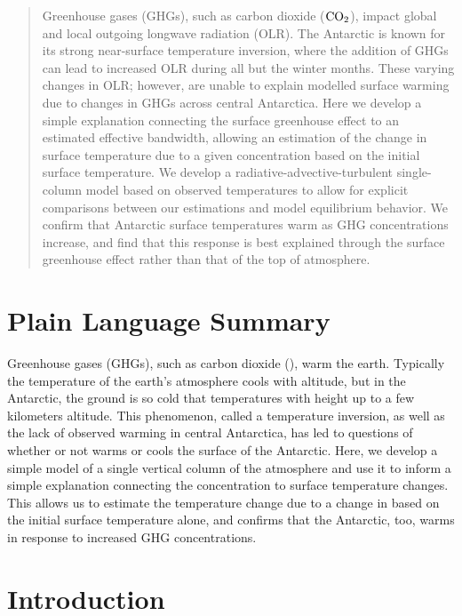 \documentclass[draft]{agujournal2019}
\begin{document}
\begin{abstract}
Greenhouse gases (GHGs), such as carbon dioxide ($\ce{CO_2}$), impact global and local outgoing longwave radiation (OLR). The Antarctic is known for its strong near-surface temperature inversion, where the addition of GHGs can lead to increased OLR during all but the winter months. These varying changes in OLR; however, are unable to explain modelled surface warming due to changes in GHGs across central Antarctica. Here we develop a simple explanation connecting the surface greenhouse effect to an estimated effective bandwidth, allowing an estimation of the change in surface temperature due to a given  concentration based on the initial surface temperature. We develop a radiative-advective-turbulent single-column model based on observed temperatures to allow for explicit comparisons between our estimations and model equilibrium behavior. We confirm that Antarctic surface temperatures warm as GHG concentrations increase, and find that this response is best explained through the surface greenhouse effect rather than that of the top of atmosphere.
\end{abstract}

\section*{Plain Language Summary}
Greenhouse gases (GHGs), such as carbon dioxide (), warm the earth. Typically the temperature of the earth's atmosphere cools with altitude, but in the Antarctic, the ground is so cold that temperatures with height up to a few kilometers altitude. This phenomenon, called a temperature inversion, as well as the lack of observed warming in central Antarctica, has led to questions of whether or not  warms or cools the surface of the Antarctic. Here, we develop a simple model of a single vertical column of the atmosphere and use it to inform a simple explanation connecting the  concentration to surface temperature changes. This allows us to estimate the temperature change due to a change in  based on the initial surface temperature alone, and confirms that the Antarctic, too, warms in response to increased GHG concentrations.


%
%

\section{Introduction}
%
\end{document}
